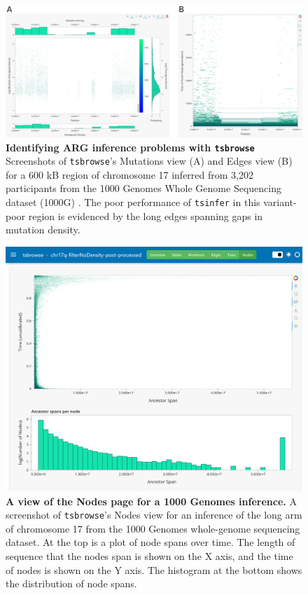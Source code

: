 \documentclass[unnumsec,webpdf,contemporary,large,namedate]{oup-authoring-template}%
\begin{document}
\begin{figure}
    \centering
    \includegraphics[width=0.95\linewidth]{figures/SuppFig2.png}
    \caption{\textbf{Identifying ARG inference problems with \texttt{tsbrowse}} 
Screenshots of \texttt{tsbrowse}'s Mutations view (A) and Edges view (B) for a
 600 kB region of chromosome 17 inferred from 3,202 participants from the 1000 
 Genomes Whole Genome Sequencing dataset (1000G) \citep{1000G2015, 1000GWGS}. 
 The poor performance of \texttt{tsinfer} in this variant-poor region is evidenced
  by the long edges spanning gaps in mutation density.}
    \label{fig:Supplementary_Figure_2}
\end{figure}

\begin{figure}
    \centering
    \includegraphics[width=0.95\linewidth]{figures/SuppFig3.png}
    \caption{\textbf{A view of the Nodes page for a 1000 Genomes inference.} A
        screenshot of \texttt{tsbrowse}'s Nodes view for an inference of the long arm
        of chromosome 17 from the 1000 Genomes whole-genome sequencing dataset. At the
        top is a plot of node spans over time. The length of sequence that the nodes
        span is shown on the X axis, and the time of nodes is shown on the Y axis. The
        histogram at the bottom shows the distribution of node spans. }
    \label{fig:Supplementary_Figure_3}
\end{figure}
\end{document}
